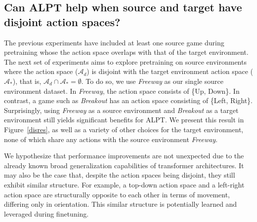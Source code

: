 \documentclass{article} %
\begin{document}
\subsection{Can ALPT help when source and target have disjoint action spaces?}
The previous experiments have included at least one source game during pretraining whose the action space overlaps with that of the target environment.  The next set of experiments aims to explore pretraining on source environments where the action space ($\mathcal{A}_d$) is disjoint with the target environment action space ($\mathcal{A}_*$), that is, $\mathcal{A}_d \cap \mathcal{A}_* = \emptyset$.  To do so, we use \emph{Freeway} as our single source environment dataset. In \emph{Freeway}, the action space consists of \{Up, Down\}. In contrast, a game such as \emph{Breakout} has an action space  consisting of \{Left, Right\}. 
Surprisingly, using \emph{Freeway} as a source environment and \emph{Breakout} as a target environment still yields significant benefits for ALPT. 
We present this result in Figure~\ref{disres}, as well as a variety of other choices for the target environment, none of which share any actions with the source environment \emph{Freeway}.

We hypothesize that performance improvements are not unexpected due to the already known broad generalization capabilities of transformer architectures. It may also be the case that, despite the action spaces being disjoint, they still exhibit similar structure. For example, a top-down action space and a left-right action space are structurally opposite to each other in terms of movement, differing only in orientation.  This similar structure is potentially learned and leveraged during finetuning.



\end{document}
